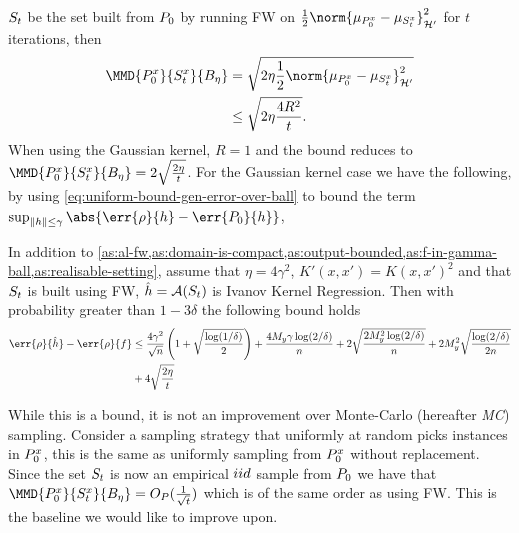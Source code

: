 \(S_{t}\) be the set built from \(P_{0}\) by running FW on
\(\frac{1}{2}\norm{\mu_{\poolsetx_0} - \mu_{\trainsetx_{t}}}_{\rkhs{H}'}^2\) for
\(t\) iterations, then
\begin{align*}
  \label{align:fw-worst-bound-on-mmd}
  \MMD{\poolsetx_{0}}{\trainsetx_{t}}{B_{\eta}} & = \sqrt{2\eta\frac{1}{2}\norm{\mu_{\poolsetx_0} - \mu_{\trainsetx_{t}}}_{\rkhs{H}'}^2} \\
                                                & \leq \sqrt{2\eta \frac{4R^2}{t}}.
\end{align*}
When using the Gaussian kernel, \(R = 1\) and the bound reduces to
\(\MMD{\poolsetx_{0}}{\trainsetx_{t}}{B_{\eta}} = 2\sqrt{\frac{2\eta}{t}}\). For
the Gaussian kernel case we have the following, by using
\ref{eq:uniform-bound-gen-error-over-ball} to bound the term \(\sup_{\|h\| \leq \gamma}\abs{\err{\rho}{h} - \err{\poolset_0}{h}}\),
\begin{theorem}
  \label{al:worst-fw-generalisation-bound-no-additional-assumptions}
  In addition to \cref{as:al-fw,as:domain-is-compact,as:output-bounded,as:f-in-gamma-ball,as:realisable-setting}, assume that \(\eta = 4\gamma^{2}\), \(K'(x, x') = K(x,
  x')^{2}\) and that \(S_t\) is built using FW, \(\hat{h} = \mathcal{A}(S_t)\) is Ivanov
  Kernel Regression. Then with probability greater than \(1 - 3\delta\) the following bound holds
  \begin{align*}
    \err{\rho}{\hat{h}} - \err{\rho}{f} & \leq \frac{4 \gamma^2}{\sqrt{n}}\left(1 + \sqrt{\frac{\log(1/\delta)}{2}} \right) + \frac{4 M_y \gamma \log(2/\delta)}{n} + 2\sqrt{\frac{2 M_y^2 \log(2/\delta)}{n}} + 2M_y^2\sqrt{\frac{\log(2/\delta)}{2n}} \\
                                        & + 4\sqrt{\frac{2\eta}{t}}
  \end{align*}
\end{theorem}

While this is a bound, it is not an improvement over Monte-Carlo (hereafter \textit{MC}) sampling.
Consider a sampling strategy that uniformly at random picks instances in
\(P^x_0\), this is the same as uniformly sampling from
\(P^x_0\) without replacement. Since the set \(S_{t}\) is now an
empirical \(iid\) sample from \(P_{0}\) we have that
\(\MMD{\poolsetx_{0}}{\trainsetx_{t}}{B_{\eta}} = O_{P}(\frac{1}{\sqrt{t}})\)
\citep{tolstikhin17_minim_estim_kernel_mean_embed} which is of the same order as
using FW. This is the baseline we would like to improve upon.

